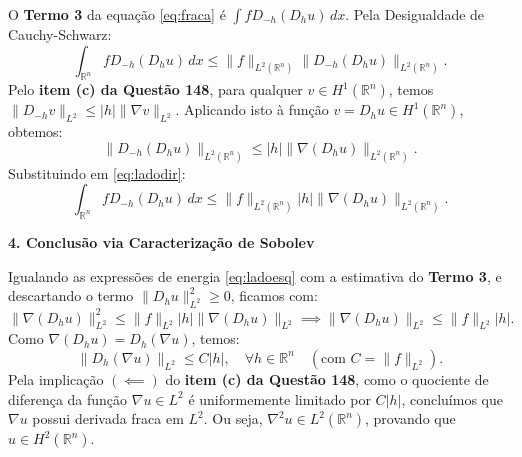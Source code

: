 \documentclass[cs_edp_2026.1.tex]{subfiles} %
\begin{document}
{	O \textbf{Termo 3} da equação \eqref{eq:fraca} é $\int f D_{-h}(D_h u) \, dx$. Pela Desigualdade de Cauchy-Schwarz:
	\begin{equation} \label{eq:ladodir}
		\int_{\mathbb{R}^n} f D_{-h}(D_h u) \, dx \le \|f\|_{L^2(\mathbb{R}^n)} \|D_{-h}(D_h u)\|_{L^2(\mathbb{R}^n)}.
	\end{equation}
	Pelo \textbf{item (c) da Questão 148}, para qualquer $v \in H^1(\mathbb{R}^n)$, temos $\|D_{-h} v\|_{L^2} \le |h| \|\nabla v\|_{L^2}$. 
	Aplicando isto à função $v = D_h u \in H^1(\mathbb{R}^n)$, obtemos:
	$$\|D_{-h}(D_h u)\|_{L^2(\mathbb{R}^n)} \le |h| \|\nabla(D_h u)\|_{L^2(\mathbb{R}^n)}.$$
	Substituindo em \eqref{eq:ladodir}:
	$$\int_{\mathbb{R}^n} f D_{-h}(D_h u) \, dx \le \|f\|_{L^2(\mathbb{R}^n)} |h| \|\nabla(D_h u)\|_{L^2(\mathbb{R}^n)}.$$
	
	\textbf{4. Conclusão via Caracterização de Sobolev}
	
	Igualando as expressões de energia \eqref{eq:ladoesq} com a estimativa do \textbf{Termo 3}, e descartando o termo $\|D_h u\|_{L^2}^2 \ge 0$, ficamos com:
	$$\|\nabla(D_h u)\|_{L^2}^2 \le \|f\|_{L^2} |h| \|\nabla(D_h u)\|_{L^2} \implies \|\nabla(D_h u)\|_{L^2} \le \|f\|_{L^2} |h|.$$
	Como $\nabla(D_h u) = D_h(\nabla u)$, temos:
	$$\|D_h(\nabla u)\|_{L^2} \le C|h|, \quad \forall h \in \mathbb{R}^n \quad (\text{com } C = \|f\|_{L^2}).$$
	Pela implicação $(\impliedby)$ do \textbf{item (c) da Questão 148}, como o quociente de diferença da função $\nabla u \in L^2$ é uniformemente limitado por $C|h|$, concluímos que $\nabla u$ possui derivada fraca em $L^2$. 
	Ou seja, $\nabla^2 u \in L^2(\mathbb{R}^n)$, provando que $\boxed{u \in H^2(\mathbb{R}^n)}$.
}


\end{document}
